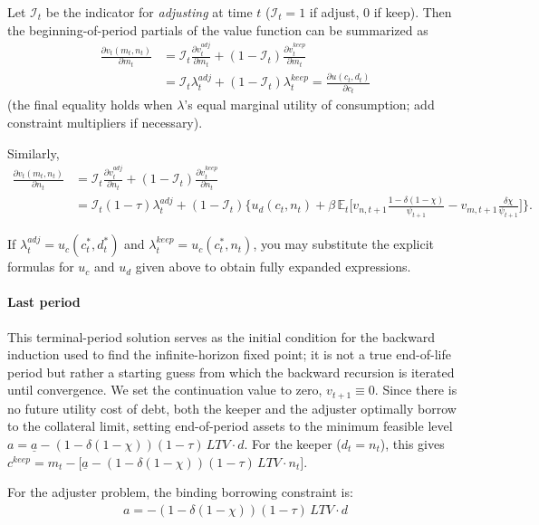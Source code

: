 \documentclass[\econtexMain]{subfiles}
\begin{document}
Let \(\mathcal{I}_t\) be the indicator for \emph{adjusting} at time \(t\) (\(\mathcal{I}_t=1\) if adjust, \(0\) if keep). Then the beginning-of-period partials of the value function can be summarized as
\begin{align}
	\frac{\partial v_t(m_t,n_t)}{\partial m_t}
	&= \mathcal{I}_t \frac{\partial v_t^{adj}}{\partial m_t}
	+ (1-\mathcal{I}_t) \frac{\partial v_t^{keep}}{\partial m_t} \\
	&= \mathcal{I}_t \lambda_t^{adj} + (1-\mathcal{I}_t) \lambda_t^{keep}
	= \frac{\partial u(c_t,d_t)}{\partial c_t}
	\label{eq:combined_m}
\end{align}
(the final equality holds when \(\lambda\)'s equal marginal utility of consumption; add constraint multipliers if necessary).

Similarly,
\begin{align}
	\frac{\partial v_t(m_t,n_t)}{\partial n_t}
	&= \mathcal{I}_t \frac{\partial v_t^{adj}}{\partial n_t}
	+ (1-\mathcal{I}_t) \frac{\partial v_t^{keep}}{\partial n_t} \\
	&= \mathcal{I}_t (1-\tau)\lambda_t^{adj}
	+ (1-\mathcal{I}_t)\Bigg\{ u_d(c_t,n_t)
	+ \beta\,\mathbb{E}_t\Big[v_{n,t+1}\frac{1-\delta(1-\chi)}{\psi_{t+1}}
	- v_{m,t+1}\frac{\delta\chi}{\psi_{t+1}}\Big]\Bigg\}.
	\label{eq:combined_n}
\end{align}

If \(\lambda_t^{adj}=u_c(c_t^\ast,d_t^\ast)\) and \(\lambda_t^{keep}=u_c(c_t^\ast,n_t)\), you may substitute the explicit formulas for \(u_c\) and \(u_d\) given above to obtain fully expanded expressions.

	
\paragraph{Last period}
This terminal-period solution serves as the initial condition for the backward induction used to find the infinite-horizon fixed point; it is not a true end-of-life period but rather a starting guess from which the backward recursion is iterated until convergence. We set the continuation value to zero, $v_{t+1}\equiv 0$. Since there is no future utility cost of debt, both the keeper and the adjuster optimally borrow to the collateral limit, setting end-of-period assets to the minimum feasible level $a = \underline{a} - (1-\delta(1-\chi))(1-\tau)\,LTV\cdot d$. For the keeper ($d_t = n_t$), this gives $c^{keep} = m_t - \bigl[\underline{a} - (1-\delta(1-\chi))(1-\tau)\,LTV\cdot n_t\bigr]$.

For the adjuster problem, the binding borrowing constraint is:
\begin{align}
	a = -(1-\delta(1-\chi))(1-\tau)\,LTV\cdot d
\end{align}
	
\end{document}
